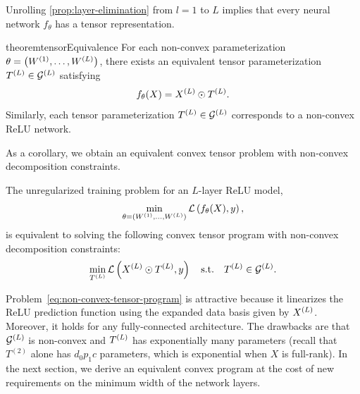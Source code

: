 Unrolling \cref{prop:layer-elimination} from \( l = 1 \) to \( L \)
implies that every neural network \( f_\theta \) has a tensor representation.

\begin{restatable}{theorem}{tensorEquivalence}\label{thm:tensor-equivalence}
    For each non-convex parameterization
    \( \theta = \left(W^{(1)}, \ldots, W^{(L)}\right) \), there exists an equivalent
    tensor parameterization \( T^{(L)} \in \mathcal{G}^{(L)} \) satisfying
    \[
        f_\theta(X) = X^{(L)} \odot T^{(L)}.
    \]
    Similarly, each tensor parameterization \( T^{(L)} \in \mathcal{G}^{(L)} \)
    corresponds to a non-convex ReLU network.
\end{restatable}

As a corollary, we obtain an equivalent convex tensor problem
with non-convex decomposition constraints.

\begin{corollary}\label{cor:non-convex-tensor-program}
    The unregularized training problem for an \( L \)-layer ReLU model,
    \begin{equation}
        \min_{\theta = (W^{(1)}, \ldots, W^{(L)})} \mathcal{L}\left(f_{\theta}(X), y\right),
    \end{equation}
    is equivalent to solving the following convex tensor program
    with non-convex decomposition constraints:
    \begin{equation}\label{eq:non-convex-tensor-program}
        \min_{T^{(L)}}
        \mathcal{L}\left(X^{(L)} \odot T^{(L)}, y\right) \quad \text{s.t.} \quad
        T^{(L)} \in \mathcal{G}^{(L)}.
    \end{equation}
\end{corollary}

Problem~\ref{eq:non-convex-tensor-program} is attractive because it
linearizes the ReLU prediction function using the
expanded data basis given by \( X^{(L)} \).
Moreover, it holds for any fully-connected architecture.
The drawbacks are that \( \mathcal{G}^{(L)} \) is non-convex and \( T^{(L)} \) has
exponentially many parameters (recall that \( T^{(2)} \) alone
has \( d_0 p_1 c \) parameters, which is exponential when \( X \)
is full-rank).
In the next section, we derive an equivalent convex program at the cost
of new requirements on the minimum width of the network layers.

